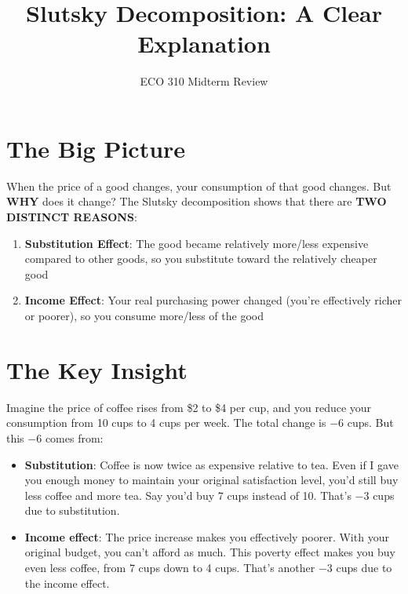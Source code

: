 \documentclass[12pt]{article}
\title{\textbf{Slutsky Decomposition: A Clear Explanation}}
\author{ECO 310 Midterm Review}
\date{}
\begin{document}
\maketitle

\section*{The Big Picture}

When the price of a good changes, your consumption of that good changes. But \textbf{WHY} does it change? The Slutsky decomposition shows that there are \textbf{TWO DISTINCT REASONS}:

\begin{tcolorbox}[colback=blue!5!white,colframe=blue!75!black,title=The Two Effects]
\begin{enumerate}[leftmargin=*]
\item \textbf{\textcolor{subcolor}{Substitution Effect}}: The good became relatively more/less expensive compared to other goods, so you substitute toward the relatively cheaper good
\item \textbf{\textcolor{incomecolor}{Income Effect}}: Your real purchasing power changed (you're effectively richer or poorer), so you consume more/less of the good
\end{enumerate}
\end{tcolorbox}

\section{The Key Insight}

Imagine the price of coffee rises from \$2 to \$4 per cup, and you reduce your consumption from 10 cups to 4 cups per week. The total change is $-6$ cups. But this $-6$ comes from:

\begin{itemize}
\item \textbf{\textcolor{subcolor}{Substitution}}: Coffee is now twice as expensive relative to tea. Even if I gave you enough money to maintain your original satisfaction level, you'd still buy less coffee and more tea. Say you'd buy 7 cups instead of 10. That's $-3$ cups due to substitution.

\item \textbf{\textcolor{incomecolor}{Income effect}}: The price increase makes you effectively poorer. With your original budget, you can't afford as much. This poverty effect makes you buy even less coffee, from 7 cups down to 4 cups. That's another $-3$ cups due to the income effect.
\end{itemize}
\end{document}
